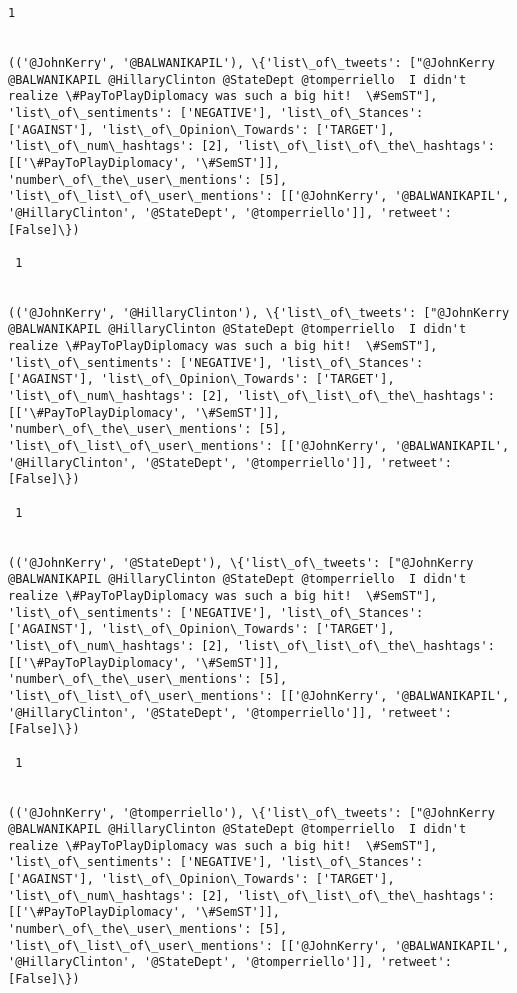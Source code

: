 \documentclass[11pt]{article}
\begin{document}
\begin{Verbatim}[commandchars=\\\{\}]
 1
 

(('@JohnKerry', '@BALWANIKAPIL'), \{'list\_of\_tweets': ["@JohnKerry @BALWANIKAPIL @HillaryClinton @StateDept @tomperriello  I didn't realize \#PayToPlayDiplomacy was such a big hit!  \#SemST"], 'list\_of\_sentiments': ['NEGATIVE'], 'list\_of\_Stances': ['AGAINST'], 'list\_of\_Opinion\_Towards': ['TARGET'], 'list\_of\_num\_hashtags': [2], 'list\_of\_list\_of\_the\_hashtags': [['\#PayToPlayDiplomacy', '\#SemST']], 'number\_of\_the\_user\_mentions': [5], 'list\_of\_list\_of\_user\_mentions': [['@JohnKerry', '@BALWANIKAPIL', '@HillaryClinton', '@StateDept', '@tomperriello']], 'retweet': [False]\})

 1
 

(('@JohnKerry', '@HillaryClinton'), \{'list\_of\_tweets': ["@JohnKerry @BALWANIKAPIL @HillaryClinton @StateDept @tomperriello  I didn't realize \#PayToPlayDiplomacy was such a big hit!  \#SemST"], 'list\_of\_sentiments': ['NEGATIVE'], 'list\_of\_Stances': ['AGAINST'], 'list\_of\_Opinion\_Towards': ['TARGET'], 'list\_of\_num\_hashtags': [2], 'list\_of\_list\_of\_the\_hashtags': [['\#PayToPlayDiplomacy', '\#SemST']], 'number\_of\_the\_user\_mentions': [5], 'list\_of\_list\_of\_user\_mentions': [['@JohnKerry', '@BALWANIKAPIL', '@HillaryClinton', '@StateDept', '@tomperriello']], 'retweet': [False]\})

 1
 

(('@JohnKerry', '@StateDept'), \{'list\_of\_tweets': ["@JohnKerry @BALWANIKAPIL @HillaryClinton @StateDept @tomperriello  I didn't realize \#PayToPlayDiplomacy was such a big hit!  \#SemST"], 'list\_of\_sentiments': ['NEGATIVE'], 'list\_of\_Stances': ['AGAINST'], 'list\_of\_Opinion\_Towards': ['TARGET'], 'list\_of\_num\_hashtags': [2], 'list\_of\_list\_of\_the\_hashtags': [['\#PayToPlayDiplomacy', '\#SemST']], 'number\_of\_the\_user\_mentions': [5], 'list\_of\_list\_of\_user\_mentions': [['@JohnKerry', '@BALWANIKAPIL', '@HillaryClinton', '@StateDept', '@tomperriello']], 'retweet': [False]\})

 1
 

(('@JohnKerry', '@tomperriello'), \{'list\_of\_tweets': ["@JohnKerry @BALWANIKAPIL @HillaryClinton @StateDept @tomperriello  I didn't realize \#PayToPlayDiplomacy was such a big hit!  \#SemST"], 'list\_of\_sentiments': ['NEGATIVE'], 'list\_of\_Stances': ['AGAINST'], 'list\_of\_Opinion\_Towards': ['TARGET'], 'list\_of\_num\_hashtags': [2], 'list\_of\_list\_of\_the\_hashtags': [['\#PayToPlayDiplomacy', '\#SemST']], 'number\_of\_the\_user\_mentions': [5], 'list\_of\_list\_of\_user\_mentions': [['@JohnKerry', '@BALWANIKAPIL', '@HillaryClinton', '@StateDept', '@tomperriello']], 'retweet': [False]\})


\end{Verbatim}
\end{document}
